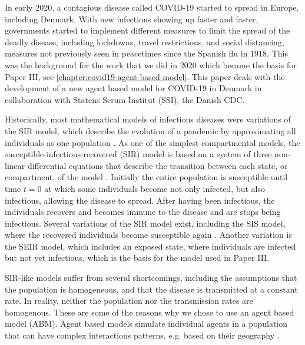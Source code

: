 In early 2020, a contagious disease called COVID-19 started to spread in Europe, including Denmark. With new infections showing up faster and faster, governments started to implement different measures to limit the spread of the deadly disease, including lockdowns, travel restrictions, and social distancing, measures not previously seen in peacetimes since the Spanish flu in 1918. This was the background for the work that we did in 2020 which became the basis for Paper III, see \autoref{chapter:covid19-agent-based-model}. This paper deals with the development of a new agent based model for COVID-19 in Denmark in collaboration with Statens Serum Institut (SSI), the Danish CDC.

Historically, most mathematical models of infectious diseases were variations of the SIR model, which describe the evolution of a pandemic by approximating all individuals as one population \autocite{kermackContributionMathematicalTheory1927}.
As one of the simplest compartmental models, the susceptible-infectious-recovered (SIR) model is based on a system of three non-linear differential equations that describe the transition between each state, or compartment, of the model \autocite{krogerAnalyticalSolutionSIRmodel2020}. Initially the entire population is susceptible until time $t=0$ at which some individuals become not only infected, but also infectious, allowing the disease to spread. After having been infectious, the individuals recovers and becomes immune to the disease and are stops being infectious. Several variations of the SIR model exist, including the SIS model, where the recovered individuals become susceptible again \autocite{hethcoteThreeBasicEpidemiological1989}. Another variation is the SEIR model, which includes an exposed state, where individuals are infected but not yet infectious, which is the basis for the model used in Paper III.

SIR-like models suffer from several shortcomings, including the assumptions that the population is homogeneous, and that the disease is transmitted at a constant rate. In reality, neither the population nor the transmission rates are homogenous. These are some of the reasons why we chose to use an agent based model (ABM). Agent based models simulate individual agents in a population that can have complex interactions patterns, e.g. based on their geography \parencite{wilenskyIntroductionAgentBasedModeling2015}.

